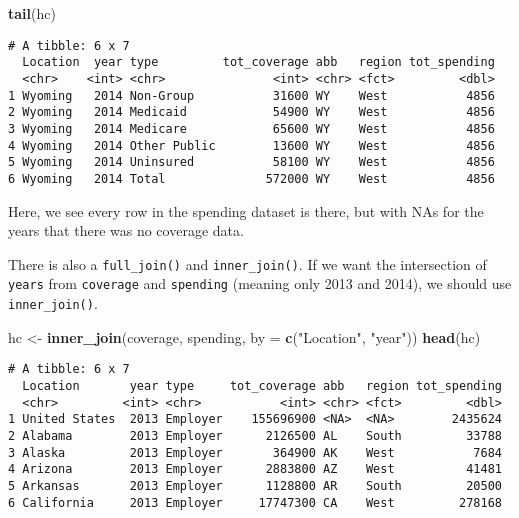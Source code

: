 \documentclass[]{article}
\newenvironment{Shaded}{\begin{snugshade}}{\end{snugshade}}
\newcommand{\DataTypeTok}[1]{\textcolor[rgb]{0.13,0.29,0.53}{#1}}
\newcommand{\KeywordTok}[1]{\textcolor[rgb]{0.13,0.29,0.53}{\textbf{#1}}}
\newcommand{\NormalTok}[1]{#1}
\newcommand{\StringTok}[1]{\textcolor[rgb]{0.31,0.60,0.02}{#1}}
\begin{document}
\begin{Shaded}
\begin{Highlighting}[]
\KeywordTok{tail}\NormalTok{(hc)}
\end{Highlighting}
\end{Shaded}

\begin{verbatim}
# A tibble: 6 x 7
  Location  year type         tot_coverage abb   region tot_spending
  <chr>    <int> <chr>               <int> <chr> <fct>         <dbl>
1 Wyoming   2014 Non-Group           31600 WY    West           4856
2 Wyoming   2014 Medicaid            54900 WY    West           4856
3 Wyoming   2014 Medicare            65600 WY    West           4856
4 Wyoming   2014 Other Public        13600 WY    West           4856
5 Wyoming   2014 Uninsured           58100 WY    West           4856
6 Wyoming   2014 Total              572000 WY    West           4856
\end{verbatim}

Here, we see every row in the spending dataset is there, but with NAs
for the years that there was no coverage data.

There is also a \texttt{full\_join()} and \texttt{inner\_join()}. If we
want the intersection of \texttt{years} from \texttt{coverage} and
\texttt{spending} (meaning only 2013 and 2014), we should use
\texttt{inner\_join()}.

\begin{Shaded}
\begin{Highlighting}[]
\NormalTok{hc <-}\StringTok{ }\KeywordTok{inner_join}\NormalTok{(coverage, spending, }\DataTypeTok{by =} \KeywordTok{c}\NormalTok{(}\StringTok{"Location"}\NormalTok{, }\StringTok{"year"}\NormalTok{))}
\KeywordTok{head}\NormalTok{(hc)}
\end{Highlighting}
\end{Shaded}

\begin{verbatim}
# A tibble: 6 x 7
  Location       year type     tot_coverage abb   region tot_spending
  <chr>         <int> <chr>           <int> <chr> <fct>         <dbl>
1 United States  2013 Employer    155696900 <NA>  <NA>        2435624
2 Alabama        2013 Employer      2126500 AL    South         33788
3 Alaska         2013 Employer       364900 AK    West           7684
4 Arizona        2013 Employer      2883800 AZ    West          41481
5 Arkansas       2013 Employer      1128800 AR    South         20500
6 California     2013 Employer     17747300 CA    West         278168
\end{verbatim}
\end{document}
